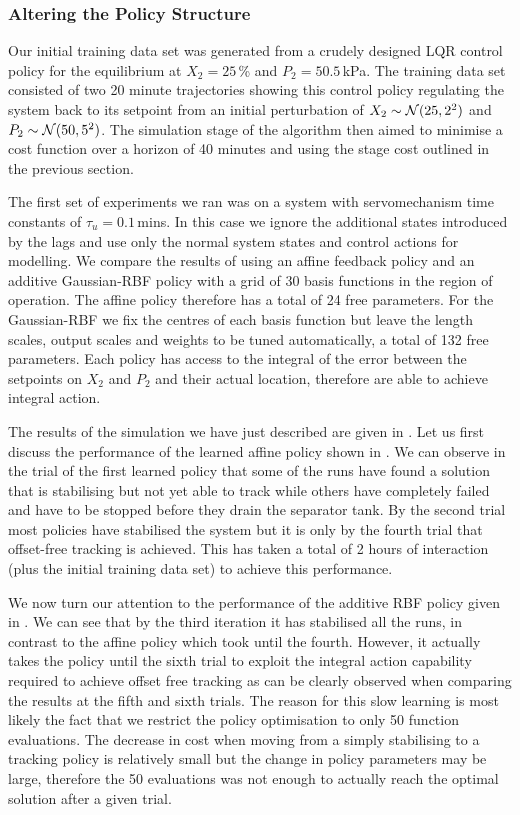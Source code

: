 \subsubsection{Altering the Policy Structure}
Our initial training data set was generated from a crudely designed LQR control policy for the equilibrium at $X_2 = 25\,$\% and $P_2 = 50.5\,$kPa. The training data set consisted of two 20 minute trajectories showing this control policy regulating the system back to its setpoint from an initial perturbation of $X_2 \sim \mathcal{N}(25,2^2)$ and $P_2 \sim \mathcal{N}(50,5^2)$. The simulation stage of the algorithm then aimed to minimise a cost function over a horizon of 40 minutes and using the stage cost outlined in the previous section.


The first set of experiments we ran was on a system with servomechanism time constants of $\tau_u = 0.1\,$mins. In this case we ignore the additional states introduced by the lags and use only the normal system states and control actions for modelling. We compare the results of using an affine feedback policy and an additive Gaussian-RBF policy with a grid of 30 basis functions in the region of operation. The affine policy therefore has a total of 24 free parameters. For the Gaussian-RBF we fix the centres of each basis function but leave the length scales, output scales and weights to be tuned automatically, a total of 132 free parameters. Each policy has access to the integral of the error between the setpoints on $X_2$ and $P_2$ and their actual location, therefore are able to achieve integral action.


The results of the simulation we have just described are given in . Let us first discuss the performance of the learned affine policy shown in . We can observe in the trial of the first learned policy that some of the runs have found a solution that is stabilising but not yet able to track while others have completely failed and have to be stopped before they drain the separator tank. By the second trial most policies have stabilised the system but it is only by the fourth trial that offset-free tracking is achieved. This has taken a total of 2 hours of interaction (plus the initial training data set) to achieve this performance. 


We now turn our attention to the performance of the additive RBF policy given in . We can see that by the third iteration it has stabilised all the runs, in contrast to the affine policy which took until the fourth. However, it actually takes the policy until the sixth trial to exploit the integral action capability required to achieve offset free tracking as can be clearly observed when comparing the results at the fifth and sixth trials. The reason for this slow learning is most likely the fact that we restrict the policy optimisation to only 50 function evaluations. The decrease in cost when moving from a simply stabilising to a tracking policy is relatively small but the change in policy parameters may be large, therefore the 50 evaluations was not enough to actually reach the optimal solution after a given trial.


